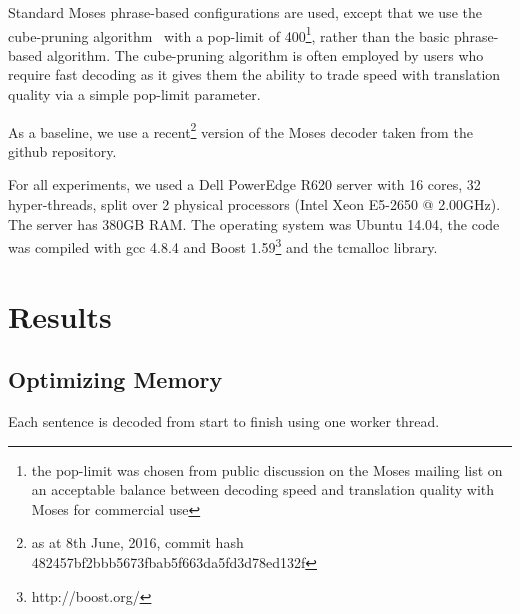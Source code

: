 \documentclass[11pt]{article}
\begin{document}
Standard Moses phrase-based configurations are used, except that we use the cube-pruning algorithm~\cite{Chiang:2007:cl} with a pop-limit of 400\footnote{the pop-limit was chosen from public discussion on the Moses mailing list on an acceptable balance between decoding speed and translation quality with Moses for commercial use %
}, rather than the basic phrase-based algorithm. The cube-pruning algorithm is often employed by users who require fast decoding as it gives them the ability to trade speed with translation quality via a simple pop-limit parameter.

As a baseline, we use a recent\footnote{as at 8th June, 2016, commit hash \scriptsize{482457bf2bbb5673fbab5f663da5fd3d78ed132f} } version of the Moses decoder taken from the github repository.

For all experiments, we used a Dell PowerEdge R620 server with 16 cores, 32 hyper-threads, split over 2 physical processors (Intel Xeon E5-2650 @ 2.00GHz). The server has 380GB RAM. The operating system was Ubuntu 14.04, the code was compiled with gcc 4.8.4 and Boost 1.59\footnote{http://boost.org/} and the tcmalloc library.

\section{Results}
\label{sec:Results}

\subsection{Optimizing Memory}

Each sentence is decoded from start to finish using one worker thread. %
\end{document}
